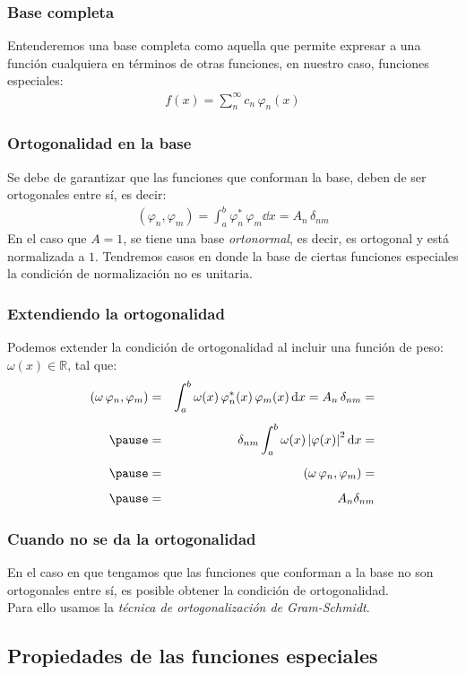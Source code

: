 \documentclass[12pt]{beamer}
\begin{document}
\begin{frame}
\frametitle{Base completa}
Entenderemos una base completa como aquella que permite expresar a una función cualquiera en términos de otras funciones, en nuestro caso, funciones especiales:
\pause
\begin{align*}
f(x) = \sum_{n}^{\infty} c_{n} \, \varphi_{n}(x)
\end{align*}
\end{frame}
\begin{frame}
\frametitle{Ortogonalidad en la base}
Se debe de garantizar que las funciones que conforman la base, deben de ser ortogonales entre sí, es decir:
\pause
\begin{align*}
(\varphi_{n}, \varphi_{m}) = \int_{a}^{b} \varphi_{n}^{*} \, \varphi_{m} \dd{x} = A_{n} \, \delta_{nm}
\end{align*}
\pause
En el caso que $A = 1$, se tiene una base \emph{ortonormal}, es decir, es ortogonal y está normalizada a $1$. \pause Tendremos casos en donde la base de ciertas funciones especiales la condición de normalización no es unitaria.
\end{frame}
\begin{frame}
\frametitle{Extendiendo la ortogonalidad}
Podemos extender la condición de ortogonalidad al incluir una función de peso: $\omega(x) \in \mathbb{R}$, tal que:
\begin{eqnarray*}
(\omega \, \varphi_{n}, \varphi_{m}) &=& \int_{a}^{b} \omega(x) \, \varphi_{n}^{*}(x) \, \varphi_{m}(x) \dd{x} = A_{n} \, \delta_{nm} = \\[0.5em] \pause
&=& \delta_{nm} \int_{a}^{b} \omega (x) \, \abs{\varphi(x)}^{2} \dd{x} = \\[0.5em] \pause
&=& (\omega \, \varphi_{n}, \varphi_{m}) = \\[0.5em] \pause
&=& A_{n} \delta_{nm}
\end{eqnarray*}
\end{frame}
\begin{frame}
\frametitle{Cuando no se da la ortogonalidad}
En el caso en que tengamos que las funciones que conforman a la base no son ortogonales entre sí, es posible obtener la condición de ortogonalidad.
\\
\bigskip
\pause
Para ello usamos la \emph{técnica de ortogonalización de Gram-Schmidt}.
\end{frame}

\subsection{Propiedades de las funciones especiales}
\end{document}

